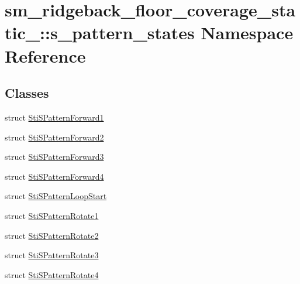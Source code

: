 \hypertarget{namespacesm__ridgeback__floor__coverage__static__1_1_1s__pattern__states}{}\section{sm\+\_\+ridgeback\+\_\+floor\+\_\+coverage\+\_\+static\+\_\+:\+:s\+\_\+pattern\+\_\+states Namespace Reference}
\label{namespacesm__ridgeback__floor__coverage__static__1_1_1s__pattern__states}
\subsection*{Classes}
\begin{DoxyCompactItemize}
\item 
struct \hyperlink{structsm__ridgeback__floor__coverage__static__1_1_1s__pattern__states_1_1StiSPatternForward1}{Sti\+S\+Pattern\+Forward1}
\item 
struct \hyperlink{structsm__ridgeback__floor__coverage__static__1_1_1s__pattern__states_1_1StiSPatternForward2}{Sti\+S\+Pattern\+Forward2}
\item 
struct \hyperlink{structsm__ridgeback__floor__coverage__static__1_1_1s__pattern__states_1_1StiSPatternForward3}{Sti\+S\+Pattern\+Forward3}
\item 
struct \hyperlink{structsm__ridgeback__floor__coverage__static__1_1_1s__pattern__states_1_1StiSPatternForward4}{Sti\+S\+Pattern\+Forward4}
\item 
struct \hyperlink{structsm__ridgeback__floor__coverage__static__1_1_1s__pattern__states_1_1StiSPatternLoopStart}{Sti\+S\+Pattern\+Loop\+Start}
\item 
struct \hyperlink{structsm__ridgeback__floor__coverage__static__1_1_1s__pattern__states_1_1StiSPatternRotate1}{Sti\+S\+Pattern\+Rotate1}
\item 
struct \hyperlink{structsm__ridgeback__floor__coverage__static__1_1_1s__pattern__states_1_1StiSPatternRotate2}{Sti\+S\+Pattern\+Rotate2}
\item 
struct \hyperlink{structsm__ridgeback__floor__coverage__static__1_1_1s__pattern__states_1_1StiSPatternRotate3}{Sti\+S\+Pattern\+Rotate3}
\item 
struct \hyperlink{structsm__ridgeback__floor__coverage__static__1_1_1s__pattern__states_1_1StiSPatternRotate4}{Sti\+S\+Pattern\+Rotate4}
\end{DoxyCompactItemize}
